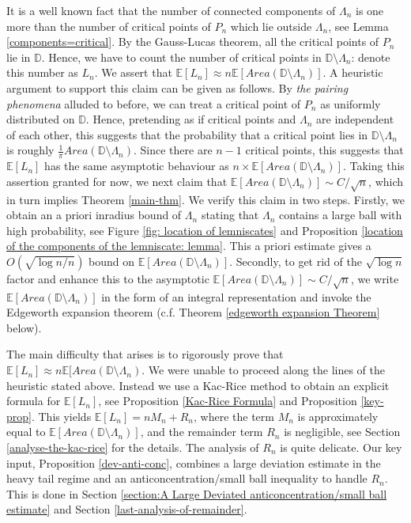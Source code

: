 \documentclass[9pt,a4paper,reqno]{amsart}
\newcommand{\E}{{\mathbb{E}}}
\theoremstyle{mine}
\theoremstyle{definition}
\theoremstyle{remark}
\newcommand{\mb}{\mathbb}
\begin{document}
It is a well known fact that the number of connected components of $\Lambda_n$ is one more than the number of critical points of $P_n$ which lie outside $\Lambda_n$, see Lemma \ref{components=critical}. By the Gauss-Lucas theorem, all the critical points of $P_n$ lie in $\mb{D}$. Hence, we have to count the number of critical points in $\mb{D}\setminus \Lambda_n$: denote this number as $L_n$. We assert that  $\mb{E}[L_n]\approx n  \mb{E}[Area(\mb{D}\setminus \Lambda_n)] $. A heuristic argument to support this claim can be given as follows. By \emph{the pairing phenomena} alluded to before, we can treat a critical point of $P_n$ as uniformly distributed on $\mb{D}$. Hence, pretending as if critical points and $\Lambda_n$ are independent of each other, this suggests that the probability that a critical point lies in $\mb{D} \setminus\Lambda_n $ is roughly $\frac{1}{\pi}Area(\mb{D} \setminus\Lambda_n)$. Since there are $n-1$ critical points, this suggests that $\mb{E}[L_n]$ has the same asymptotic behaviour as $n \times \mb{E}[Area(\mb{D}\setminus \Lambda_n)]$. Taking this assertion granted for now, we next claim that $\mb{E}[Area(\mb{D}\setminus \Lambda_n)] \sim  C/\sqrt{n}$, which in turn implies Theorem \ref{main-thm}. We verify this claim in two steps. Firstly, we obtain an a priori inradius bound of $\Lambda_n$ stating that $\Lambda_n$ contains a large ball with high probability, see Figure \ref{fig: location of lemniscates} and Proposition \ref{location of the components of the lemniscate: lemma}. This a priori estimate gives a $O(\sqrt{\log n /n})$ bound on $\mb{E}[Area(\mb{D}\setminus \Lambda_n)]$. Secondly, to get rid of the $\sqrt{\log n}$ factor and enhance this to the asymptotic $\mb{E}[Area(\mb{D}\setminus \Lambda_n)] \sim C/\sqrt{n}$, we write $\mb{E}[Area(\mb{D}\setminus \Lambda_n)]$ in the form of an integral representation and invoke the Edgeworth expansion theorem
(c.f. Theorem \ref{edgeworth expansion Theorem} below). 

The main difficulty that arises is to rigorously prove that $\E[L_n]\approx n \mb{E}[Area(\mb{D}\setminus \Lambda_n) $. We were unable to proceed along the lines of the heuristic stated above. Instead we use a Kac-Rice method to obtain an explicit formula for $\mb{E}[L_n]$, see Proposition \ref{Kac-Rice Formula} and Proposition \ref{key-prop}. This yields $\E[L_n] = nM_n + R_n$, where the term $M_n$ is approximately equal to $\mb{E}[Area(\mb{D}\setminus \Lambda_n)]$, and the remainder term $R_n$ is negligible, see Section \ref{analyse-the-kac-rice} for the details. The analysis of $R_n$ is quite delicate. Our key input, Proposition \ref{dev-anti-conc}, combines a large deviation estimate in the heavy tail regime and an anticoncentration/small ball inequality to handle $R_n$. This is done in Section \ref{section:A Large Deviated anticoncentration/small ball estimate} and Section \ref{last-analysis-of-remainder}. 
\end{document}
